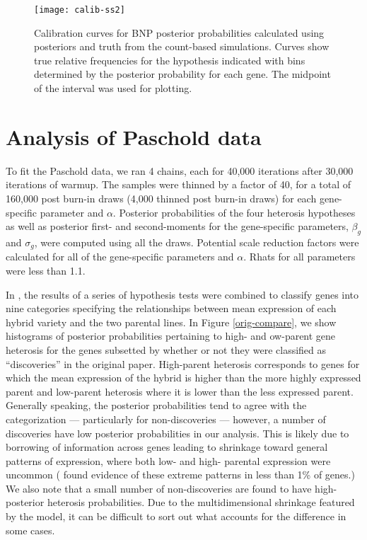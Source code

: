 {\begin{figure}[ht!]
\centering
\texttt{[image: calib-ss2]}
\begin{minipage}{.8\textwidth}
\caption{\small Calibration curves for BNP posterior probabilities calculated using posteriors and truth from the count-based simulations. Curves show true relative frequencies for the hypothesis indicated with bins determined by the posterior probability for each gene. The midpoint of the interval was used for plotting.}
\end{minipage}
\label{calib-ss2}
\end{figure}

\section{Analysis of Paschold data}
\label{analysis}
To fit the Paschold data, we ran 4 chains, each for 40,000 iterations after 30,000 iterations of warmup. The samples were thinned by a factor of 40, for a total of 160,000 post burn-in draws (4,000 thinned post burn-in draws) for each gene-specific parameter and $\alpha$. Posterior probabilities of the four heterosis hypotheses as well as posterior first- and second-moments for the gene-specific parameters, $\beta_g$ and $\sigma_g$, were computed using all the draws. Potential scale reduction factors were calculated for all of the gene-specific parameters and $\alpha$. Rhats for all parameters were less than 1.1.

In \citet{paschold}, the results of a series of hypothesis tests were combined to classify genes into nine categories specifying the relationships between mean expression of each hybrid variety and the two parental lines. In Figure \ref{orig-compare}, we show histograms of posterior probabilities pertaining to high- and ow-parent gene heterosis for the genes subsetted by whether or not they were classified as ``discoveries'' in the original paper. High-parent heterosis corresponds to genes for which the mean expression of the hybrid is higher than the more highly expressed parent and low-parent heterosis where it is lower than the less expressed parent. Generally speaking, the posterior probabilities tend to agree with the categorization --- particularly for non-discoveries --- however, a number of discoveries have low posterior probabilities in our analysis. This is likely due to borrowing of information across genes leading to shrinkage toward general patterns of expression, where both low- and high- parental expression were uncommon (\citet{paschold} found evidence of these extreme patterns in less than 1\% of genes.) We also note that a small number of non-discoveries are found to have high-posterior heterosis probabilities. Due to the multidimensional shrinkage featured by the model, it can be difficult to sort out what accounts for the difference in some cases.

}
